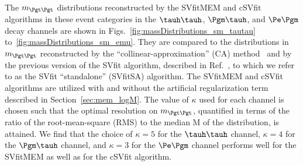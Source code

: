 The $m_{\Pgt\Pgt}$ distributions reconstructed by the SVfitMEM and cSVfit algorithms in these event categories 
in the $\tauh\tauh$, $\Pgm\tauh$, and $\Pe\Pgm$ decay channels are shown in Figs.~\ref{fig:massDistributions_sm_tautau} to~\ref{fig:massDistributions_sm_emu}.
They are compared to the distributions in $m_{\Pgt\Pgt}$ reconstructed by the ``collinear-approximation'' (CA) method~\cite{massRecoCollinearApprox}
and by the previous version of the
SVfit algorithm, described in Ref.~\cite{SVfit}, to which we refer to as the SVfit ``standalone'' (SVfitSA) algorithm.
The SVfitMEM and cSVfit algorithms are utilized with and without the artificial regularization term described in Section~\ref{sec:mem_logM}.
The value of $\kappa$ used for each channel is chosen such that the optimal resolution on $m_{\Pgt\Pgt}$, 
quantified in terms of the ratio of the root-mean-square (RMS) to the median $\textrm{M}$ of the distribution,
is attained.
We find that the choice of $\kappa = 5$ for the $\tauh\tauh$ channel, $\kappa = 4$ for the $\Pgm\tauh$ channel,
and $\kappa = 3$ for the $\Pe\Pgm$ channel performs well for the SVfitMEM as well as for the cSVfit algorithm.

%
%

